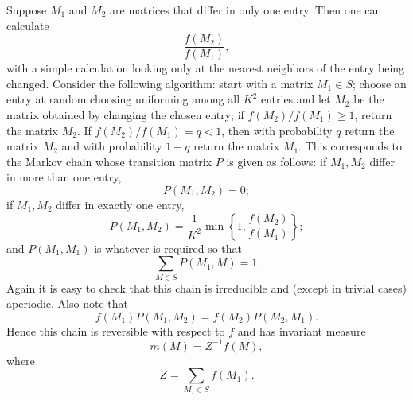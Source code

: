 \documentclass{stml-l}
\theoremstyle{definition}
\numberwithin{equation}{chapter}
\numberwithin{figure}{chapter}
\numberwithin{figure}{section}
\begin{document}
Suppose $M_{1}$ and $M_{2}$ are matrices that differ in only one
entry. Then one can calculate
\begin{equation*}
\frac{f(M_{2})}{f(M_{1})},
\end{equation*}
with a simple calculation looking only at the nearest neighbors of
the entry being changed. Consider the following algorithm: start with
a matrix $M_{1} \in S$; choose an entry at random choosing
uniforming among all $K^{2}$ entries and let $M_{2}$ be the matrix
obtained by changing the chosen entry; if $f(M_{2})/f(M_{1})\geq 1$,
return the matrix $M_{2}$. If $f(M_{2})/f(M_{1})=q<1$, then with
probability $q$ return the matrix $M_{2}$ and with probability $1-q$
return the matrix $M_{1}$. This corresponds to the Markov chain
whose transition matrix $P$ is given as follows: if $M_{1},M_{2}$
differ in more than one entry,
\begin{equation*}
P(M_{1},M_{2})=0;
\end{equation*}
if $M_{1},M_{2}$ differ in exactly one entry,
\begin{equation*}
P(M_{1},M_{2})=\frac{1}{K^{2}}\min\left\{1,\frac{f(M_{2})}{f(M_{1})}\right\};
\end{equation*}
and $P(M_{1},M_{1})$ is whatever is required so that
\begin{equation*}
\sum\limits_{M\in S}P(M_{1},M)=1.
\end{equation*}
Again it is easy to check that this chain is irreducible and (except
in trivial cases) aperiodic. Also note that
\begin{equation*}
f(M_{1})P(M_{1},M_{2})=f(M_{2})P(M_{2},M_{1}).
\end{equation*}
Hence this chain is reversible with respect to $f$ and has invariant
measure
\begin{equation*}
m(M)=Z^{-1}f(M),
\end{equation*}
where
\begin{equation*}
Z=\sum\limits_{M_{1}\in S}f(M_{1}).
\end{equation*}
\end{document}
